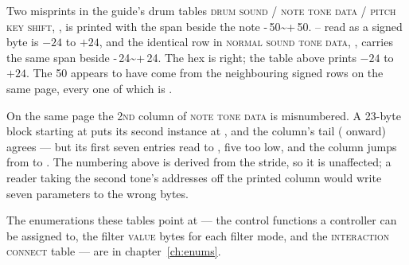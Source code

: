 \begin{caution}{Two misprints in the guide's drum tables}
\textsc{drum sound / note tone data / pitch key shift}, , is printed with the
span  beside the note \textsc{-\,50\textasciitilde+\,50}.
-- read as a signed byte is $-24$ to $+24$, and the identical row in
\textsc{normal sound tone data}, , carries the same span beside
\textsc{-\,24\textasciitilde+\,24}. The hex is right; the table above prints $-24$ to
$+24$. The \textsc{50} appears to have come from the neighbouring signed rows on the same
page, every one of which is .

On the same page the \textsc{2nd} column of \textsc{note tone data} is misnumbered. A
23-byte block starting at  puts its second instance at , and the
column's tail ( onward) agrees --- but its first seven entries read
 to , five too low, and the column jumps from  to
. The numbering above is derived from the stride, so it is unaffected; a
reader taking the second tone's addresses off the printed column would write seven
parameters to the wrong bytes.
\end{caution}

The enumerations these tables point at --- the control functions a controller can be
assigned to, the filter \textsc{value} bytes for each filter mode, and the
\textsc{interaction connect} table --- are in chapter~\ref{ch:enums}.


